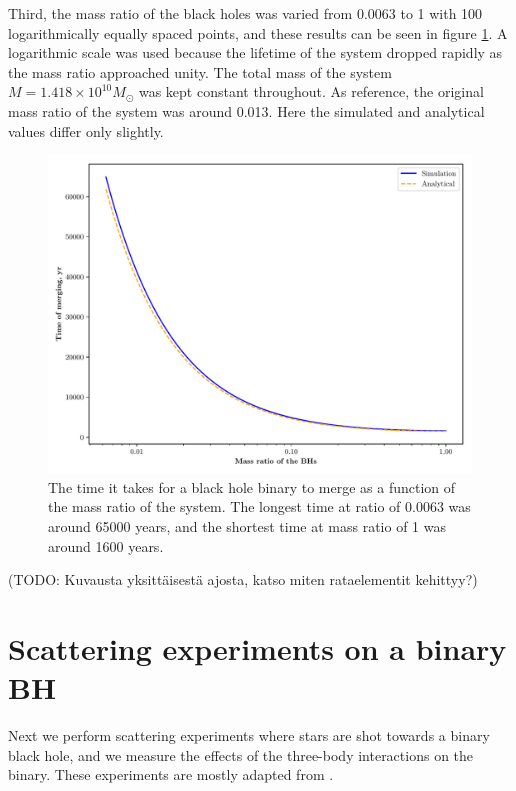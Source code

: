 \documentclass[english, oneside]{HYgradu}
\begin{document}
Third, the mass ratio of the black holes was varied from 0.0063 to 1 with 100 logarithmically equally spaced points, and these results can be seen in figure \ref{fig:bh-merge-ratio}. A logarithmic scale was used because the lifetime of the system dropped rapidly as the mass ratio approached unity. The total mass of the system $M = 1.418 \times 10^10 M_{\odot}$ was kept constant throughout. As reference, the original mass ratio of the system was around 0.013. Here the simulated and analytical values differ only slightly.
\begin{figure}[h!tb]
\centering
\includegraphics[scale=0.6]{../images/bh-merge-ratio.pdf}
\caption{The time it takes for a black hole binary to merge as a function of the mass ratio of the system. The longest time at ratio of 0.0063 was around 65000 years, and the shortest time at mass ratio of 1 was around 1600 years.}
\label{fig:bh-merge-ratio}
\end{figure}


(TODO: Kuvausta yksittäisestä ajosta, katso miten rataelementit kehittyy?)

\clearpage
\section{Scattering experiments on a binary BH}

Next we perform scattering experiments where stars are shot towards a binary black hole, and we measure the effects of the three-body interactions on the binary.
These experiments are mostly adapted from \cite{sesana:2006}.
\end{document}
